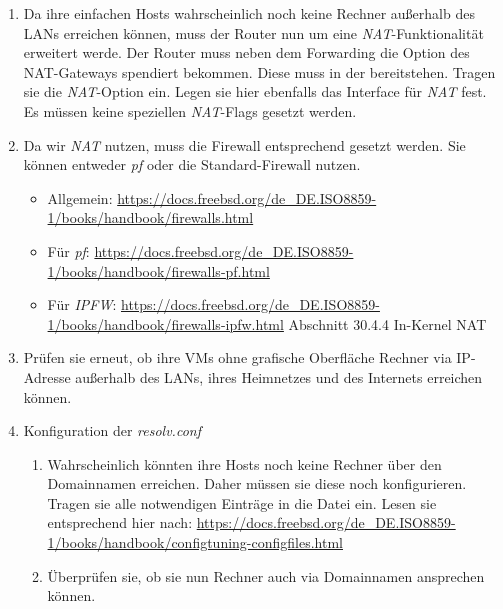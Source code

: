 \documentclass[paper=a4,fontsize=11pt]{scrartcl}%
\begin{document}
\begin{enumerate}
\begin{enumerate}
\begin{enumerate}
     	\end{enumerate}
	\end{enumerate}
	\item Da ihre einfachen Hosts wahrscheinlich noch keine Rechner außerhalb des LANs erreichen können, muss der Router nun um eine \emph{NAT}-Funktionalität erweitert werde. Der Router muss neben dem Forwarding die Option des NAT-Gateways spendiert bekommen. Diese muss in der  bereitstehen. Tragen sie die \emph{NAT}-Option ein. Legen sie hier ebenfalls das Interface für \emph{NAT} fest. Es müssen keine speziellen \emph{NAT}-Flags gesetzt werden.
	\item Da wir \emph{NAT} nutzen, muss die Firewall entsprechend gesetzt werden. Sie können entweder \emph{pf} oder die Standard-Firewall nutzen.
	\begin{itemize}
		\item Allgemein: \url{https://docs.freebsd.org/de_DE.ISO8859-1/books/handbook/firewalls.html}
		\item Für \emph{pf}: \url{https://docs.freebsd.org/de_DE.ISO8859-1/books/handbook/firewalls-pf.html}
		\item Für \emph{IPFW}: \url{https://docs.freebsd.org/de_DE.ISO8859-1/books/handbook/firewalls-ipfw.html} Abschnitt 30.4.4 In-Kernel NAT
	\end{itemize}
	\item Prüfen sie erneut, ob ihre VMs ohne grafische Oberfläche Rechner via IP-Adresse außerhalb des LANs, ihres Heimnetzes und des Internets erreichen können.
	\item Konfiguration der \emph{resolv.conf}
	\begin{enumerate}
		\item Wahrscheinlich könnten ihre Hosts noch keine Rechner über den Domainnamen erreichen. Daher müssen sie diese noch konfigurieren. Tragen sie alle notwendigen Einträge in die Datei  ein. Lesen sie entsprechend hier nach: \url{https://docs.freebsd.org/de_DE.ISO8859-1/books/handbook/configtuning-configfiles.html}
		\item Überprüfen sie, ob sie nun Rechner auch via Domainnamen ansprechen können.
	\end{enumerate}
\end{enumerate}
\end{document}

